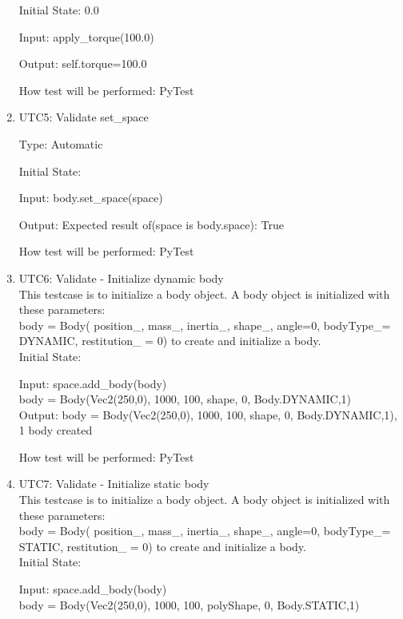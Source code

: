 \documentclass[12pt, titlepage]{article}
\begin{document}
\begin{enumerate}
Initial State: 0.0

Input: apply\_torque(100.0)

Output: self.torque=100.0

How test will be performed: PyTest

\item{UTC5}{: Validate set\_space\\}

Type: Automatic

Initial State: 

Input: body.set\_space(space)

Output: Expected result of(space is body.space): True

How test will be performed: PyTest\\

\item{UTC6}{: Validate - Initialize dynamic body\\}
This testcase is to initialize a body object.
A body object is initialized with these parameters:\\ 
body = Body( position\_, mass\_, inertia\_, shape\_, angle=0, bodyType\_= DYNAMIC, restitution\_ = 0) to create and initialize a body.\\

Initial State: 

Input: space.add\_body(body)\\
body = Body(Vec2(250,0), 1000, 100, shape, 0, Body.DYNAMIC,1)\\

Output: body = Body(Vec2(250,0), 1000, 100, shape, 0, Body.DYNAMIC,1), 1 body created

How test will be performed: PyTest\\

\item{UTC7}{: Validate - Initialize static body\\}
This testcase is to initialize a body object.
A body object is initialized with these parameters:\\ 
body = Body( position\_, mass\_, inertia\_, shape\_, angle=0, bodyType\_= STATIC, restitution\_ = 0) to create and initialize a body.\\

Initial State: 

Input: space.add\_body(body)\\
body = Body(Vec2(250,0), 1000, 100, polyShape, 0, Body.STATIC,1)\\


\end{enumerate}
\end{document}
